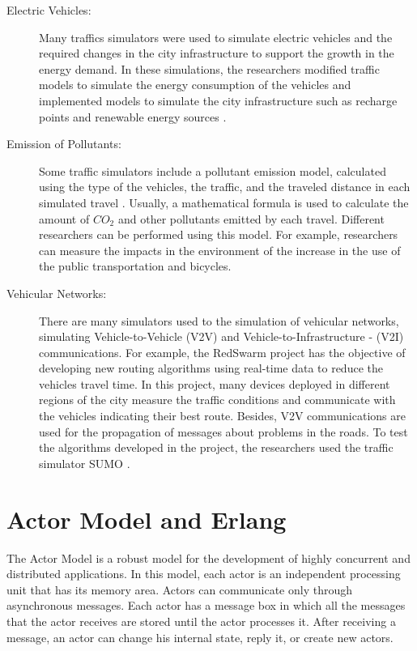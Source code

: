 \begin{description}

\item[Electric Vehicles:] Many traffics simulators were used to simulate electric vehicles and the required changes in the city infrastructure to support the growth in the energy demand. In these simulations, the researchers modified traffic models to simulate the energy consumption of the vehicles and implemented models to simulate the city infrastructure such as recharge points and renewable energy sources \cite{allan2015benchmark,geske2010modeling}. 

\item[Emission of Pollutants:] Some traffic simulators include a pollutant emission model, calculated using the type of the vehicles, the traffic, and the traveled distance in each simulated travel \cite{xia2005modelling,hulsmann2014modelling,krajzewicz2012recent,zhou2015integrating}. Usually, a mathematical formula is used to calculate the amount of $CO_2$ and other pollutants emitted by each travel. Different researchers can be performed using this model. For example, researchers can measure the impacts in the environment of the increase in the use of the public transportation and bicycles.
 
\item[Vehicular Networks:]  There are many simulators used to the simulation of vehicular networks, simulating Vehicle-to-Vehicle (V2V) and Vehicle-to-Infrastructure - (V2I) communications. For example, the RedSwarm project \cite{stolfi2014red} has the objective of developing new routing algorithms using real-time data to reduce the vehicles travel time. In this project, many devices deployed in different regions of the city measure the traffic conditions and communicate with the vehicles indicating their best route. Besides, V2V communications are used for the propagation of messages about problems in the roads. To test the algorithms developed in the project, the researchers used the traffic simulator SUMO \cite{behrisch2011sumo}.


\end{description}

\section{Actor Model and Erlang}
\label{sec:modeloAtores}

The Actor Model \cite {de2014dealing} is a robust model for the development of highly concurrent and distributed applications. In this model, each actor is an independent processing unit that has its memory area. Actors can communicate only through asynchronous messages. Each actor has a message box in which all the messages that the actor receives are stored until the actor processes it. After receiving a message, an actor can change his internal state, reply it, or create new actors.

